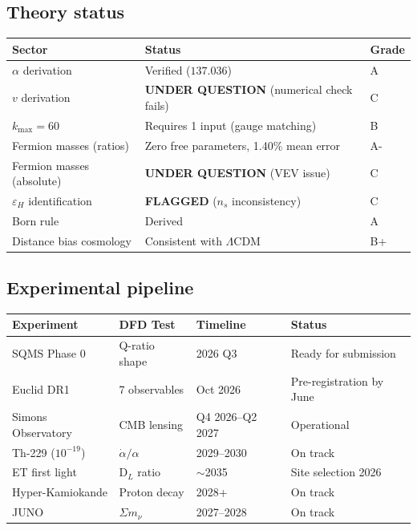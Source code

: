 \documentclass[11pt,a4paper]{article}
\begin{document}
\subsection{Theory status}

\begin{center}
\begin{tabular}{lll}
\toprule
\textbf{Sector} & \textbf{Status} & \textbf{Grade} \\
\midrule
$\alpha$ derivation & Verified ($137.036$) & A \\
$v$ derivation & \textbf{UNDER QUESTION} (numerical check fails) & C \\
$k_{\max} = 60$ & Requires 1 input (gauge matching) & B \\
Fermion masses (ratios) & Zero free parameters, 1.40\% mean error & A- \\
Fermion masses (absolute) & \textbf{UNDER QUESTION} (VEV issue) & C \\
$\varepsilon_H$ identification & \textbf{FLAGGED} ($n_s$ inconsistency) & C \\
Born rule & Derived & A \\
Distance bias cosmology & Consistent with $\Lambda$CDM & B+ \\
\bottomrule
\end{tabular}
\end{center}

\subsection{Experimental pipeline}

\begin{center}
\begin{tabular}{llll}
\toprule
\textbf{Experiment} & \textbf{DFD Test} & \textbf{Timeline} & \textbf{Status} \\
\midrule
SQMS Phase 0 & Q-ratio shape & 2026 Q3 & Ready for submission \\
Euclid DR1 & 7 observables & Oct 2026 & Pre-registration by June \\
Simons Observatory & CMB lensing & Q4 2026--Q2 2027 & Operational \\
Th-229 ($10^{-19}$) & $\dot{\alpha}/\alpha$ & 2029--2030 & On track \\
ET first light & D$_L$ ratio & $\sim$2035 & Site selection 2026 \\
Hyper-Kamiokande & Proton decay & 2028+ & On track \\
JUNO & $\Sigma m_\nu$ & 2027--2028 & On track \\
\bottomrule
\end{tabular}
\end{center}
\end{document}
